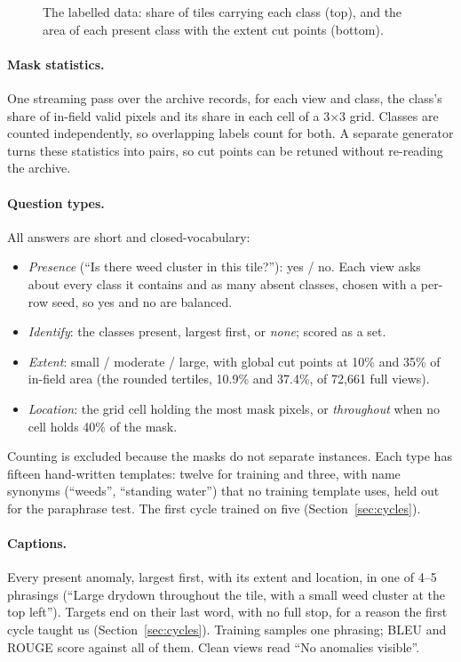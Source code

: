 \documentclass[10pt,twocolumn]{article}
\begin{document}
\begin{figure}[t]\centering
{}
\caption{The labelled data: share of tiles carrying each class (top), and the area of each present class with the extent cut points (bottom).}\label{fig:data}
\end{figure}

\paragraph{Mask statistics.} One streaming pass over the archive records, for each view and class, the class's share of in-field valid pixels and its share in each cell of a 3$\times$3 grid. Classes are counted independently, so overlapping labels count for both. A separate generator turns these statistics into pairs, so cut points can be retuned without re-reading the archive.

\paragraph{Question types.} All answers are short and closed-vocabulary:
\begin{itemize}
\item \emph{Presence} (``Is there weed cluster in this tile?''): yes / no. Each view asks about every class it contains and as many absent classes, chosen with a per-row seed, so yes and no are balanced.
\item \emph{Identify}: the classes present, largest first, or \emph{none}; scored as a set.
\item \emph{Extent}: small / moderate / large, with global cut points at 10\% and 35\% of in-field area (the rounded tertiles, 10.9\% and 37.4\%, of 72,661 full views).
\item \emph{Location}: the grid cell holding the most mask pixels, or \emph{throughout} when no cell holds 40\% of the mask.
\end{itemize}
Counting is excluded because the masks do not separate instances. Each type has fifteen hand-written templates: twelve for training and three, with name synonyms (``weeds'', ``standing water'') that no training template uses, held out for the paraphrase test. The first cycle trained on five (Section~\ref{sec:cycles}).

\paragraph{Captions.} Every present anomaly, largest first, with its extent and location, in one of 4--5 phrasings (``Large drydown throughout the tile, with a small weed cluster at the top left''). Targets end on their last word, with no full stop, for a reason the first cycle taught us (Section~\ref{sec:cycles}). Training samples one phrasing; BLEU and ROUGE score against all of them. Clean views read ``No anomalies visible''.
\end{document}
